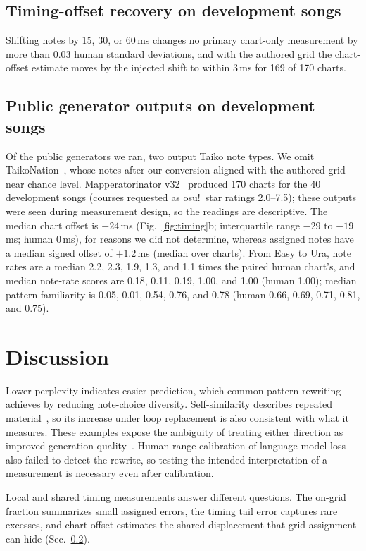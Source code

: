 \documentclass[letterpaper]{article}
\begin{document}
\subsection{Timing-offset recovery on development songs}
\label{sec:shift}
Shifting notes by 15, 30, or 60\,ms changes no primary chart-only
measurement by more than 0.03 human standard deviations, and with the
authored grid the chart-offset estimate moves by the injected shift to
within 3\,ms for 169 of 170 charts.

\subsection{Public generator outputs on development songs}
\label{sec:generators}
Of the public generators we ran, two output Taiko note types. We omit
TaikoNation~\cite{halina2021taikonation}, whose notes after our conversion
aligned with the authored grid near chance level.
Mapperatorinator v32~\cite{mapperatorinator} produced 170 charts for the
40 development songs (courses requested as osu!\ star ratings 2.0--7.5);
these outputs were seen during measurement design, so the readings are
descriptive. The median chart offset is $-24$\,ms (Fig.~\ref{fig:timing}b;
interquartile range
$-29$ to $-19$\,ms; human 0\,ms), for reasons we did not determine, whereas
assigned notes have a median signed offset of $+1.2$\,ms (median over charts). From
Easy to Ura, note rates are a median 2.2, 2.3, 1.9, 1.3, and 1.1 times the
paired human chart's, and median note-rate scores are 0.18, 0.11, 0.19,
1.00, and 1.00 (human 1.00); median pattern familiarity is 0.05, 0.01,
0.54, 0.76, and 0.78 (human 0.66, 0.69, 0.71, 0.81, and 0.75).

\section{Discussion}
Lower perplexity indicates easier prediction, which common-pattern
rewriting achieves by reducing note-choice diversity. Self-similarity
describes repeated material~\cite{wu2020jazz}, so its increase under loop
replacement is also consistent with what it measures. These examples expose
the ambiguity of treating either direction as improved generation
quality~\cite{theis2016note}. Human-range calibration of language-model loss
also failed to detect the rewrite, so testing the intended interpretation of
a measurement is necessary even after calibration.

Local and shared timing measurements answer different questions. The
on-grid fraction summarizes small assigned errors, the timing tail error
captures rare excesses, and chart offset estimates the shared
displacement that grid assignment can hide (Sec.~\ref{sec:generators}).
\end{document}

